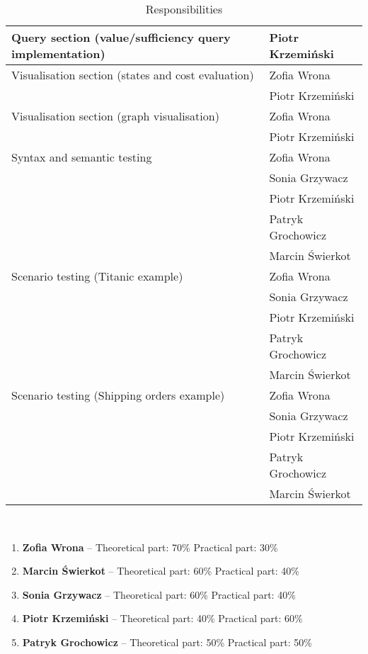 \documentclass[a4paper]{article}
\begin{document}
\begin{table}[H]
\begin{tabular}{|l|l|}
Query section (value/sufficiency query implementation)                            & Piotr Krzemiński \\ \hline
Visualisation section (states and cost evaluation)                              & Zofia Wrona \\ & Piotr Krzemiński \\ \hline
Visualisation section (graph visualisation)                            & Zofia Wrona \\ & Piotr Krzemiński \\ \hline
Syntax and semantic testing  & Zofia Wrona \\& Sonia Grzywacz \\ & Piotr Krzemiński \\& Patryk Grochowicz \\& Marcin Świerkot  \\\hline
Scenario testing (Titanic example)                      & Zofia Wrona\\& Sonia Grzywacz \\& Piotr Krzemiński \\& Patryk Grochowicz \\& Marcin Świerkot \\ \hline
Scenario testing (Shipping orders example)           & Zofia Wrona\\& Sonia Grzywacz\\& Piotr Krzemiński \\& Patryk Grochowicz \\& Marcin Świerkot \\ \hline
\end{tabular}
\caption{Responsibilities}
\label{thesis-table}
\end{table}
\\

\begin{enumerate}
    \item \textbf{Zofia Wrona} -- Theoretical part: 70\%  Practical part: 30\%
    \item \textbf{Marcin Świerkot} -- Theoretical part: 60\%  Practical part: 40\%
    \item \textbf{Sonia Grzywacz} -- Theoretical part: 60\%  Practical part: 40\%
    \item \textbf{Piotr Krzemiński} -- Theoretical part: 40\%  Practical part: 60\%
    \item \textbf{Patryk Grochowicz} -- Theoretical part: 50\%  Practical part: 50\%
\end{enumerate}


\end{document}
